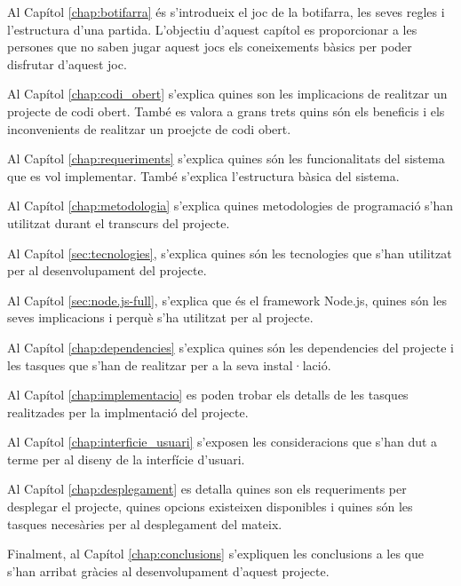 Al Capítol \ref{chap:botifarra} és s'introdueix el joc de la botifarra, les seves regles i l'estructura d'una partida. L'objectiu d'aquest capítol es proporcionar a les persones que no saben jugar aquest jocs els coneixements bàsics per poder disfrutar d'aquest joc. 

Al Capítol \ref{chap:codi_obert} s'explica quines son les implicacions de realitzar un projecte de codi obert. També es valora a grans trets quins són els beneficis i els inconvenients de realitzar un proejcte de codi obert.

Al Capítol \ref{chap:requeriments} s'explica quines són les funcionalitats del sistema que es vol implementar. També s'explica l'estructura bàsica del sistema. 

Al Capítol \ref{chap:metodologia} s'explica quines metodologies de programació s'han utilitzat durant el transcurs del projecte.

Al Capítol \ref{sec:tecnologies}, s'explica quines són les tecnologies que s'han utilitzat per al desenvolupament del projecte.

Al Capítol \ref{sec:node.js-full}, s'explica que és el framework Node.js, quines són les seves implicacions i perquè s'ha utilitzat per al projecte. 

Al Capítol \ref{chap:dependencies} s'explica quines són les dependencies del projecte i les tasques que s'han de realitzar per a la seva instal·lació. 

Al Capítol \ref{chap:implementacio} es poden trobar els detalls de les tasques realitzades per la implmentació del projecte. 

Al Capítol \ref{chap:interficie_usuari} s'exposen les consideracions que s'han dut a terme per al diseny de la interfície d'usuari.

Al Capítol \ref{chap:desplegament} es detalla quines son els requeriments per desplegar el projecte, quines opcions existeixen disponibles i quines són les tasques necesàries per al desplegament del mateix. 

Finalment, al Capítol \ref{chap:conclusions} s'expliquen les conclusions a les que s'han arribat gràcies al desenvolupament d'aquest projecte. 
